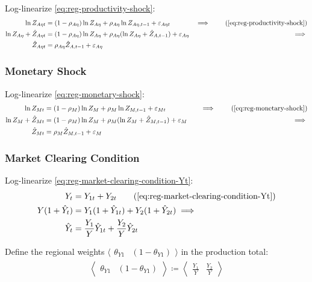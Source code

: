 \documentclass[
thesis.tex
]{subfiles}
\begin{document}
Log-linearize \ref{eq:reg-productivity-shock}:
\begin{alignat}{2}
	\ln{Z_{A\eta t}} &= (1-\rho_{A\eta})\ln{Z_{A\eta}} + \rho_{A\eta}\ln{Z_{A\eta,t-1}} + \varepsilon_{A\eta t} &\implies \tag{\ref{eq:reg-productivity-shock}} \\
	\ln{Z_{A\eta}} + \hat{Z}_{A\eta t} &= (1-\rho_{A\eta}) \ln{Z_{A\eta}} + \rho_{A\eta} (\ln{Z_{A\eta}} + \hat{Z}_{A,t-1}) + \varepsilon_{A\eta} &\implies \nonumber \\
	\hat{Z}_{A\eta t} &= \rho_{A\eta} \hat{Z}_{A,t-1} + \varepsilon_{A\eta} \label{eq:reg-ll-productivity-shock}
\end{alignat}


\subsubsection*{Monetary Shock}

Log-linearize \ref{eq:reg-monetary-shock}:
\begin{alignat}{2}
	\ln{Z_{Mt}} &= (1-\rho_M)\ln{Z_M} + \rho_M\ln{Z_{M,t-1}} + \varepsilon_{Mt} &\implies \tag{\ref{eq:reg-monetary-shock}} \\
	\ln{Z_{M}} + \hat{Z}_{Mt} &= (1-\rho_M) \ln{Z_M} + \rho_M (\ln{Z_{M}} + \hat{Z}_{M,t-1}) + \varepsilon_{M} \quad &\implies \nonumber \\
	\hat{Z}_{Mt} &= \rho_M \hat{Z}_{M,t-1} + \varepsilon_{M} \label{eq:reg-ll-monetary-shock}
\end{alignat}


\subsubsection*{Market Clearing Condition}

Log-linearize \ref{eq:reg-market-clearing-condition-Yt}:
\begin{alignat}{2}
	Y_{t} &= Y_{1 t} + Y_{2 t} \tag{\ref{eq:reg-market-clearing-condition-Yt}} \\
	Y (1 +\hat{Y}_{t}) &= Y_{1} (1 +\hat{Y}_{1t}) + Y_{2} (1 +\hat{Y}_{2t}) \implies \nonumber \\
	\hat{Y}_{t} &= \frac{Y_{1}}{Y} \hat{Y}_{1t} + \frac{Y_{2}}{Y} \hat{Y}_{2t} \label{eq:reg-ll-market-clearing-condition-Yt-2}
\end{alignat}

Define the regional weights $\langle \begin{smallmatrix} \theta_{Y1} & (1-\theta_{Y1}) \end{smallmatrix} \rangle$ in the production total:
\begin{align}
	\left\langle \begin{matrix} \theta_{Y1} & (1-\theta_{Y1}) \end{matrix} \right\rangle \coloneq \left\langle \begin{matrix} \frac{Y_{1}}{Y} & \frac{Y_{2}}{Y} \end{matrix} \right\rangle \label{eq:reg-ss-Y1-Y2-weight-in-Y}
\end{align}
\end{document}
